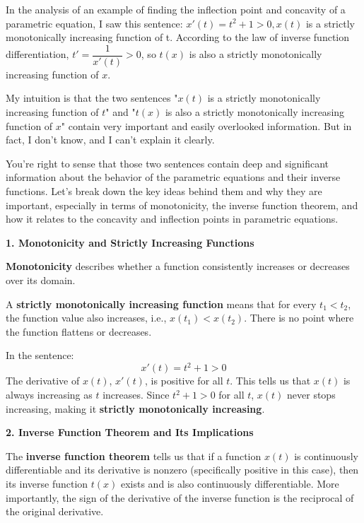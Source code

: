 \documentclass[a4paper,12pt]{book}
\begin{document}
\begin{bluebox}
In the analysis of an example of finding the inflection point and concavity of a parametric equation, I saw this sentence: \(x{\prime}(t)=t^2+1>0, x(t)\) is a strictly monotonically increasing function of t. According to the law of inverse function differentiation, \(t{\prime}={\dfrac{1}{x{\prime}(t)}}>0\), so \(t(x)\) is also a strictly monotonically increasing function of \(x\).

My intuition is that the two sentences "\(x(t)\) is a strictly monotonically increasing function of \(t\)" and "\(t(x)\) is also a strictly monotonically increasing function of \(x\)" contain very important and easily overlooked information. But in fact, I don't know, and I can't explain it clearly.
\end{bluebox}

You're right to sense that those two sentences contain deep and significant information about the behavior of the parametric equations and their inverse functions. Let’s break down the key ideas behind them and why they are important, especially in terms of monotonicity, the inverse function theorem, and how it relates to the concavity and inflection points in parametric equations.

\textbf{1. Monotonicity and Strictly Increasing Functions}

\textbf{Monotonicity} describes whether a function consistently increases or decreases over its domain.

A \textbf{strictly monotonically increasing function} means that for every \( t_1 < t_2 \), the function value also increases, i.e., \( x(t_1) < x(t_2) \). There is no point where the function flattens or decreases.

In the sentence:
\[
x'(t) = t^2 + 1 > 0
\]
The derivative of \( x(t) \), \( x'(t) \), is positive for all \( t \). This tells us that \( x(t) \) is always increasing as \( t \) increases. Since \( t^2 + 1 > 0 \) for all \( t \), \( x(t) \) never stops increasing, making it \textbf{strictly monotonically increasing}.

\textbf{2. Inverse Function Theorem and Its Implications}

The \textbf{inverse function theorem} tells us that if a function \( x(t) \) is continuously differentiable and its derivative is nonzero (specifically positive in this case), then its inverse function \( t(x) \) exists and is also continuously differentiable. More importantly, the sign of the derivative of the inverse function is the reciprocal of the original derivative.
\end{document}
